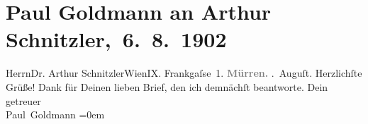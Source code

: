 

         \renewcommand{\erwaehnteOrte}{Orte: Frankgasse 1, Mürren, Wien}
         \renewcommand{\erwaehnteWerke}{}
               \section[ Paul Goldmann an Arthur Schnitzler, 6. 8. 1902]{ Paul Goldmann an Arthur Schnitzler, 6. 8. 1902}\nopagebreak{}\rehead{ }\begin{ledgroupsized}[t]{13cm}\normalsize\beginnumbering \toendnotes[C]{\smallbreak\pagebreak[2]} 
\pstart{}{\pb}Herrn\pend{}\pstart{}Dr. Arthur Schnitzler\pend{}\pstart{}Wien\pend{}\pstart{}IX. Frankgaſse 1.\pend{}{\bigskip}\pstart
           \noindent{}{\pb}\textcolor{gray}{\textbf{Mürren.}}\pend
           . Auguſt.\pend
           \pstart
           Herzlichſte Grüße! Dank für Deinen lieben Brief, den ich demnächſt beantworte.\pend
           \pstart
           Dein {\\[\baselineskip]}getreuer {\\[\baselineskip]}\spacefill\mbox{Paul Goldmann}\pend
           \leftskip=0em{}
         
         \endnumbering{}\end{ledgroupsized}  \newcommand{\dateiname}{L03217}\newcommand{\titel}{Paul Goldmann an Arthur Schnitzler, 6. 8. 1902}\newcommand{\editorInnen}{Martin Anton Müller und Laura Untner}
      